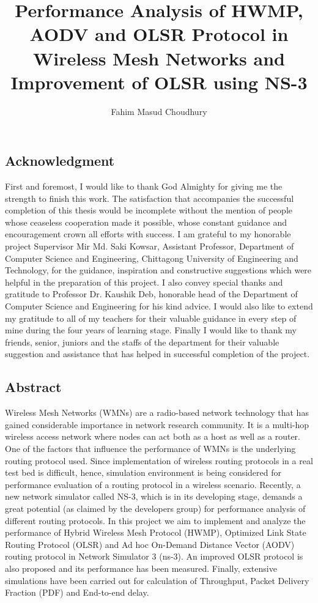 \documentclass[12pt,a4paper]{report}
\author{Fahim Masud Choudhury}
\title{Performance Analysis of HWMP, AODV and OLSR Protocol in Wireless Mesh Networks and Improvement of OLSR using NS-3}
\begin{document}
\maketitle
\tableofcontents
\listoffigures

\newpage
\begin{center}
\section*{Acknowledgment}
\justify
First and foremost, I would like to thank God Almighty for giving me the strength to finish this work. The satisfaction that accompanies the successful completion of this thesis would be incomplete without the mention of people whose ceaseless cooperation made it possible, whose constant guidance and encouragement crown all efforts with success. I am grateful to my honorable project Supervisor Mir Md. Saki Kowsar, Assistant Professor, Department of Computer Science and Engineering, Chittagong University of Engineering and Technology, for the guidance, inspiration and constructive suggestions which were helpful in the preparation of this project. I also convey special thanks and gratitude to Professor Dr. Kaushik Deb, honorable head of the Department of Computer Science and Engineering for his kind advice. I would also like to extend my gratitude to all of my teachers for their valuable guidance in every step of mine during the four years of learning stage. Finally I would like to thank my friends, senior, juniors and the staffs of the department for their valuable suggestion and assistance that has helped in successful completion of the project.
\end{center}


\newpage
\begin{center}
\section*{Abstract}
\justify
Wireless Mesh Networks (WMNs) are a radio-based network technology that has gained considerable importance in network research community. It is a multi-hop wireless access network where nodes can act both as a host as well as a router. One of the factors that influence the performance of WMNs is the underlying routing protocol used. Since implementation of wireless routing protocols in a real test bed is difficult, hence, simulation environment is being considered for performance evaluation of a routing protocol in a wireless scenario. Recently, a new network simulator called NS-3, which is in its developing stage, demands a great potential (as claimed by the developers group) for performance analysis of different routing protocols. In this project we aim to implement and analyze the performance of Hybrid Wireless Mesh Protocol (HWMP), Optimized Link State Routing Protocol (OLSR) and Ad hoc On-Demand Distance Vector (AODV) routing protocol in Network Simulator 3 (ns-3). An improved OLSR protocol is also proposed and its performance has been measured. Finally, extensive simulations have been carried out for calculation of Throughput, Packet Delivery Fraction (PDF) and End-to-end delay.

\end{center}
\end{document}
